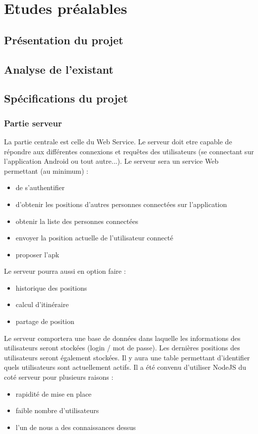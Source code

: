 \section{Etudes préalables}

\subsection{Présentation du projet}

\subsection{Analyse de l'existant}

\subsection{Spécifications du projet}

\subsubsection{Partie serveur}
La partie centrale est celle du Web Service. Le serveur doit etre capable de répondre aux différentes connexions et requêtes des utilisateurs (se connectant sur l'application Android ou tout autre...). Le serveur sera un service Web permettant (au minimum) :
\begin{itemize}
    \item de s'authentifier
    \item d'obtenir les positions d'autres personnes connectées sur l'application
    \item obtenir la liste des personnes connectées
    \item envoyer la position actuelle de l'utilisateur connecté
    \item proposer l'apk
\end{itemize}

Le serveur pourra aussi en option faire :
\begin{itemize}
    \item historique des positions
    \item calcul d'itinéraire
    \item partage de position
\end{itemize}

Le serveur comportera une base de données dans laquelle les informations des utilisateurs seront stockées (login / mot de passe). Les dernières positions des utilisateurs seront également stockées. Il y aura une table permettant d'identifier quels utilisateurs sont actuellement actifs.
Il a été convenu d'utiliser NodeJS du coté serveur pour plusieurs raisons :
\begin{itemize}
    \item rapidité de mise en place
    \item faible nombre d'utilisateurs
    \item l'un de nous a des connaissances dessus
\end{itemize}

